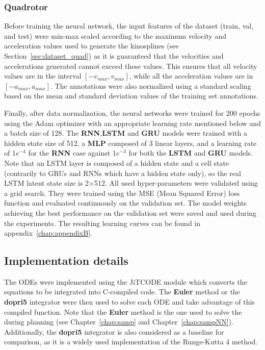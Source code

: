 \subsubsection{Quadrotor}\label{sec:train_quad}

Before training the neural network, the input features of the dataset (train, val, and test) were min-max scaled according to the maximum velocity and acceleration values used to generate the kinosplines (see Section~\ref{sec:dataset_quad}) as it is guaranteed that the velocities and accelerations generated cannot exceed these values. 
This ensures that all velocity values are in the interval $[-v_{max}, v_{max}]$, while all the acceleration values are in $[-a_{max}, a_{max}]$. 
The annotations were also normalized using a standard scaling based on the mean and standard deviation values of the training set annotations.

Finally, after data normalization, the neural networks were trained for 200 epochs using the Adam optimizer \cite{kingma2014adam} with an appropriate learning rate mentioned below and a batch size of 128. 
The \textbf{RNN},\textbf{LSTM} and \textbf{GRU} models were trained with a hidden state size of 512, a \textbf{MLP} composed of 3 linear layers, and a learning rate of $1e^{-4}$ for the \textbf{RNN} case against $1e^{-3}$ for both the \textbf{LSTM} and \textbf{GRU} models.
Note that an LSTM layer is composed of a hidden state and a cell state (contrarily to GRUs and RNNs which have a hidden state only), so the real LSTM latent state size is 2$\times$512.
All used hyper-parameters were validated using a grid search.
They were trained using the MSE (Mean Squared Error) loss function and evaluated continuously on the validation set. 
The model weights achieving the best performance on the validation set were saved and used during the experiments.
The resulting learning curves can be found in appendix~\ref{chap:appendixB}.

\subsection{Implementation details}

The ODEs were implemented using the JiTCODE \cite{cJit} module which converts the equations to be integrated into C-compiled code.
The \textbf{Euler} method or the \textbf{dopri5} integrator were then used to solve each ODE and take advantage of this compiled function.
Note that the \textbf{Euler} method is the one used to solve the  during planning (see Chapter~\ref{chap:samp} and Chapter~\ref{chap:sampNN}).
Additionally, the \textbf{dopri5} integrator is also considered as a baseline for comparison, as it is a widely used implementation of the Runge-Kutta 4 method.

